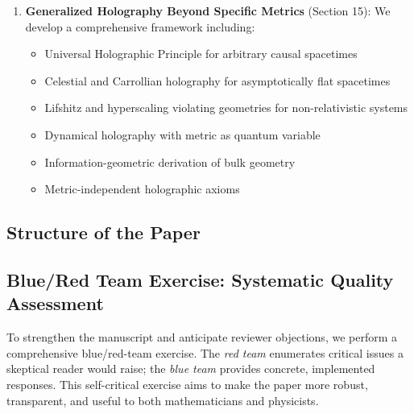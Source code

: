 \documentclass[12pt,a4paper]{article}
\begin{document}
\begin{enumerate}
    \item \textbf{Generalized Holography Beyond Specific Metrics} (Section 15): We develop a comprehensive framework including:
    \begin{itemize}
        \item Universal Holographic Principle for arbitrary causal spacetimes
        \item Celestial and Carrollian holography for asymptotically flat spacetimes
        \item Lifshitz and hyperscaling violating geometries for non-relativistic systems
        \item Dynamical holography with metric as quantum variable
        \item Information-geometric derivation of bulk geometry
        \item Metric-independent holographic axioms
    \end{itemize}
\end{enumerate}

\subsection{Structure of the Paper}
\subsection{Blue/Red Team Exercise: Systematic Quality Assessment}
\label{subsec:blue-red-team}

To strengthen the manuscript and anticipate reviewer objections, we perform a comprehensive blue/red-team exercise. The \emph{red team} enumerates critical issues a skeptical reader would raise; the \emph{blue team} provides concrete, implemented responses. This self-critical exercise aims to make the paper more robust, transparent, and useful to both mathematicians and physicists.
\end{document}
